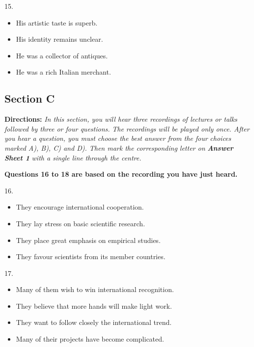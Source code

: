 \documentclass[UTF8,11pt]{ctexart}
\begin{document}
15.


\begin{itemize}[leftmargin=2em,itemsep=.2em,topsep=.4em]\item[A.] His artistic taste is superb.
\item[B.] His identity remains unclear.
\item[C.] He was a collector of antiques.
\item[D.] He was a rich Italian merchant.
\end{itemize}

\subsection*{\textbf{Section C}}


\textbf{Directions:}\textit{ In this section, you will hear three recordings of lectures or talks followed by three or four questions.} \textit{The recordings will be played only once. After you hear a question, you must choose the best answer from the four} \textit{choices marked A), B), C) and D). Then mark the corresponding letter on}\textbf{\textit{ Answer Sheet 1}}\textit{ with a single line} \textit{through the centre.}


\textbf{Questions 16 to 18 are based on the recording you have just heard.}


16.


\begin{itemize}[leftmargin=2em,itemsep=.2em,topsep=.4em]\item[A.] They encourage international cooperation.
\item[B.] They lay stress on basic scientific research.
\item[C.] They place great emphasis on empirical studies.
\item[D.] They favour scientists from its member countries.
\end{itemize}

17.


\begin{itemize}[leftmargin=2em,itemsep=.2em,topsep=.4em]\item[A.] Many of them wish to win international recognition.
\item[B.] They believe that more hands will make light work.
\item[C.] They want to follow closely the international trend.
\item[D.] Many of their projects have become complicated.
\end{itemize}
\end{document}
